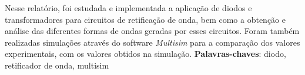 \setlength{\absparsep}{18pt} %
 \begin{resumo}
 Nesse relat\'{o}rio, foi estudada e implementada a aplica\c{c}\~{a}o de diodos e transformadores para circuitos de retifica\c{c}\~{a}o de onda, bem como a obten\c{c}\~{a}o e an\'{a}lise das diferentes formas de ondas geradas por esses circuitos. Foram tamb\'{e}m realizadas simula\c{c}\~{o}es atrav\'{e}s do software \textit{Multisim} para a compara\c{c}\~{a}o dos valores experimentais, com os valores obtidos na simula\c{c}\~{a}o.
 \noindent
 \textbf{Palavras-chaves}: diodo, retificador de onda, multisim
\end{resumo} 